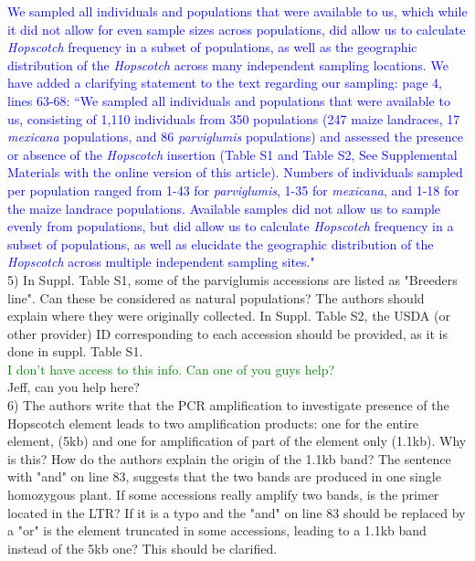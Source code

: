 \documentclass[11pt]{article}
\newcommand{\res}[1]{\noindent \textcolor{blue}{{#1}} \\}
\newcommand{\lev}[1]{\noindent \textcolor{green}{{#1}} \\}
\newcommand{\mbh}[1]{\noindent \textcolor{Dandelion}{{#1}}\\}
\begin{document}
\res{We sampled all individuals and populations that were available to us, which while it did not allow for even sample sizes across populations, did allow us to calculate \emph{Hopscotch} frequency in a subset of populations, as well as the geographic distribution of the \emph{Hopscotch} across many independent sampling locations. We have added a clarifying statement to the text regarding our sampling: page 4, lines 63-68: ``We sampled all individuals and populations that were available to us, consisting of 1,110 individuals from 350 populations (247 maize landraces, 17 \emph{mexicana} populations, and 86 \emph{parviglumis} populations) and assessed the presence or absence of the \emph{Hopscotch} insertion (Table S1 and Table S2, See Supplemental Materials with the online version of this article). Numbers of individuals sampled per population ranged from 1-43 for \emph{parviglumis}, 1-35 for \emph{mexicana}, and 1-18 for the maize landrace populations. Available samples did not allow us to sample evenly from populations, but did allow us to calculate \emph{Hopscotch} frequency in a subset of populations, as well as elucidate the geographic distribution of the \emph{Hopscotch} across multiple independent sampling sites."}

5) In Suppl. Table S1, some of the parviglumis accessions are listed as "Breeders line". Can these be considered as natural populations? The authors should explain where they were originally collected. In Suppl. Table S2, the USDA (or other provider) ID corresponding to each accession should be provided, as it is done in suppl. Table S1.\\

\lev{I don't have access to this info. Can one of you guys help?}

\mbh{Jeff, can you help here?}

6) The authors write that the PCR amplification to investigate presence of the Hopscotch element leads to two amplification products: one for the entire element, (5kb) and one for amplification of part of the element only (1.1kb). Why is this? How do the authors explain the origin of the 1.1kb band? The sentence with "and" on line 83, suggests that the two bands are produced in one single homozygous plant. If some accessions really amplify two bands, is the primer located in the LTR? If it is a typo and the "and" on line 83 should be replaced by a "or" is the element truncated in some accessions, leading to a 1.1kb band instead of the 5kb one? This should be clarified.\\
\end{document}
